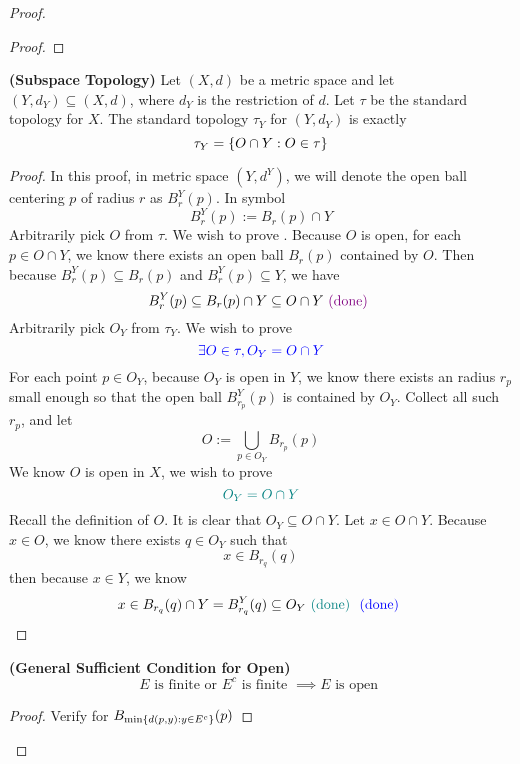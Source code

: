 \documentclass{report}
\begin{document}
\begin{proof}
\begin{proof}
\end{proof}
\begin{theorem}
\label{1.5.9}
\textbf{(Subspace Topology)} Let $(X,d)$ be a metric space and let $(Y,d_Y)\subseteq (X,d)$, where $d_Y$ is the restriction of $d$. Let $\tau$ be the standard topology for $X$. The standard topology $\tau_Y$ for $(Y,d_Y)$ is exactly
\begin{equation}
\tau_Y=\{ O\cap Y: O\in \tau \}
\end{equation}
\end{theorem}
\begin{proof}
In this proof, in metric space $(Y,d^Y)$, we will denote the open ball centering $p$ of radius $r$ as $B^Y_r(p)$. In symbol
\begin{equation}
B_r^Y(p):=B_r(p)\cap Y
\end{equation}
Arbitrarily pick $O$ from $\tau$. We wish to prove . Because $O$ is open, for each $p\in O\cap Y$, we know there exists an open ball  $B_r(p)$ contained by $O$. Then because $B_r^Y(p)\subseteq B_r(p)$ and $B_r^Y(p)\subseteq Y$, we have
\begin{equation}
B_r^Y(p)\subseteq B_r(p)\cap Y\subseteq O\cap Y\textcolor{violet}{\text{ (done) }}
\end{equation}
Arbitrarily pick $O_Y$ from  $\tau_Y$. We wish to prove
\begin{equation}
\textcolor{blue}{\exists O\in \tau, O_Y=O\cap Y}
\end{equation}
For each point $p\in O_Y$, because  $O_Y$ is open in $Y$, we know there exists an radius $r_p$ small enough so that the open ball $B_{r_p}^Y(p)$ is contained by $O_Y$. Collect all such $r_p$, and let
\begin{equation}
O:=\bigcup_{p\in O_Y}B_{r_p}(p)
\end{equation}
We know $O$ is open in  $X$, we wish to prove
 \begin{equation}
\textcolor{teal}{O_Y=O\cap Y}
\end{equation}
Recall the definition of $O$. It is clear that $O_Y\subseteq O\cap Y$. Let $x\in O\cap Y$. Because $x\in O$, we know there exists $q\in O_Y$ such that
\begin{equation}
x\in B_{r_q}(q)
\end{equation}
then because $x\in Y$, we know
\begin{equation}
x\in B_{r_q}(q)\cap Y=B_{r_q}^Y(q)\subseteq O_Y\textcolor{teal}{\text{ (done) }} \textcolor{blue}{\text{ (done) }}
\end{equation}
\end{proof}
\begin{theorem}
\label{1.5.10}
\textbf{(General Sufficient Condition for Open)}
\begin{equation}
E\text{ is finite or }E^c\text{ is finite }\implies E\text{ is open }
\end{equation}
\end{theorem}
\begin{proof}
Verify for  $B_{\min \{ d(p,y):y\in E^c \}}(p)$
\end{proof}

\end{proof}
\end{document}
